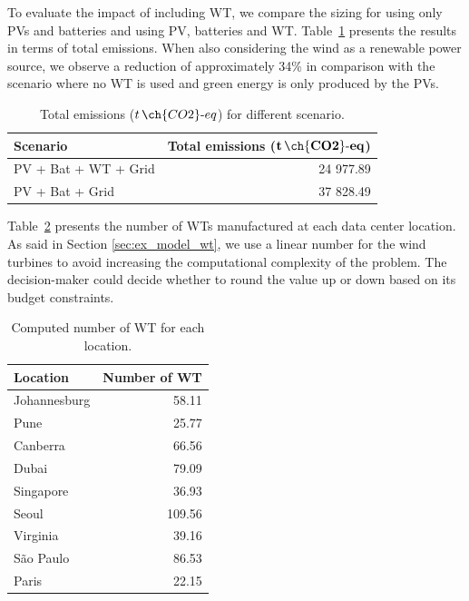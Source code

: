 To evaluate the impact of including WT, we compare the sizing for using only PVs and batteries and using PV, batteries and WT. Table~\ref{tab:total_wind_and_pv_co2} presents the results in terms of total emissions. When also considering the wind as a renewable power source, we observe a reduction of approximately 34\% in comparison with the scenario where no WT is used and green energy is only produced by the PVs.

\begin{table}[h]  
  \caption{Total emissions ($t\,\ch{CO2}\text{-}eq$) for different scenario. }\label{tab:total_wind_and_pv_co2} \centering  
  \begin{tabular}{|l|r|}
  \hline    
  \textbf{Scenario} &   \textbf{Total emissions ($\mathbf{t\,\ch{CO2}\text{-}eq}$)} \\
  \hline    
  PV + Bat + WT + Grid  & 24 977.89 \\    
  \hline
  PV + Bat + Grid       & 37 828.49 \\    
  \hline
\end{tabular}  
\end{table}


Table~\ref{tab:results_wt} presents the number of WTs manufactured at each data center location. As said in Section \ref{sec:ex_model_wt}, we use a linear number for the wind turbines to avoid increasing the computational complexity of the problem. The decision-maker could decide whether to round the value up or down based on its budget constraints.

\begin{table}[h]
  \caption{Computed number of WT for each location.}\label{tab:results_wt} \centering
  \begin{tabular}{|l|r|}
  \hline
    
  \textbf{Location} &   \textbf{Number of WT} \\
  \hline
  Johannesburg & 58.11   \\
  \hline
  Pune  & 25.77 \\
  \hline
  Canberra  & 66.56 \\
  \hline
  Dubai   &  79.09  \\
  \hline
  Singapore & 36.93  \\
  \hline     
  Seoul    & 109.56  \\
  \hline
  Virginia   & 39.16 \\
  \hline
  São Paulo   & 86.53 \\
  \hline 
  Paris    &   22.15 \\
  \hline
  
\end{tabular}  
\end{table}

